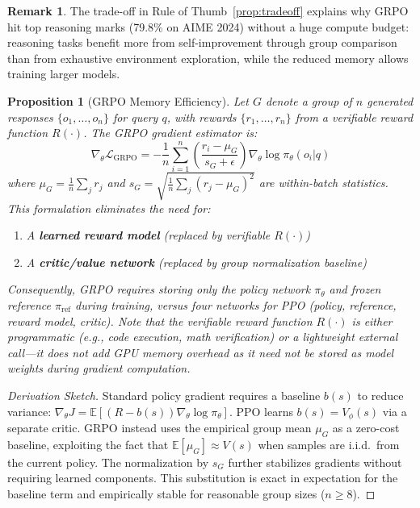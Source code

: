 \documentclass[12pt,a4paper]{report}
\newtheorem{proposition}[theorem]{Proposition}
\theoremstyle{definition}
\newtheorem{remark}[theorem]{Remark}
\begin{document}
\begin{remark}
The trade-off in Rule of Thumb~\ref{prop:tradeoff} explains why GRPO hit top reasoning marks (79.8\% on AIME 2024) without a huge compute budget: reasoning tasks benefit more from self-improvement through group comparison than from exhaustive environment exploration, while the reduced memory allows training larger models.
\end{remark}

\begin{proposition}[GRPO Memory Efficiency]
\label{prop:grpo_memory}
Let $G$ denote a group of $n$ generated responses $\{o_1, \ldots, o_n\}$ for query $q$, with rewards $\{r_1, \ldots, r_n\}$ from a verifiable reward function $R(\cdot)$. The GRPO gradient estimator is:
\begin{equation}
\nabla_\theta \mathcal{L}_{\text{GRPO}} = -\frac{1}{n} \sum_{i=1}^{n} \left( \frac{r_i - \mu_G}{s_G + \epsilon} \right) \nabla_\theta \log \pi_\theta(o_i | q)
\end{equation}
where $\mu_G = \frac{1}{n}\sum_j r_j$ and $s_G = \sqrt{\frac{1}{n}\sum_j (r_j - \mu_G)^2}$ are within-batch statistics. This formulation eliminates the need for:
\begin{enumerate}
    \item A \textbf{learned reward model} (replaced by verifiable $R(\cdot)$)
    \item A \textbf{critic/value network} (replaced by group normalization baseline)
\end{enumerate}
Consequently, GRPO requires storing only the policy network $\pi_\theta$ and frozen reference $\pi_{\text{ref}}$ during training, versus four networks for PPO (policy, reference, reward model, critic). Note that the verifiable reward function $R(\cdot)$ is either programmatic (e.g., code execution, math verification) or a lightweight external call---it does not add GPU memory overhead as it need not be stored as model weights during gradient computation.
\end{proposition}

\begin{proof}[Derivation Sketch]
Standard policy gradient requires a baseline $b(s)$ to reduce variance: $\nabla_\theta J = \mathbb{E}[(R - b(s)) \nabla_\theta \log \pi_\theta]$. PPO learns $b(s) = V_\phi(s)$ via a separate critic. GRPO instead uses the empirical group mean $\mu_G$ as a zero-cost baseline, exploiting the fact that $\mathbb{E}[\mu_G] \approx V(s)$ when samples are i.i.d.\ from the current policy. The normalization by $s_G$ further stabilizes gradients without requiring learned components. This substitution is exact in expectation for the baseline term and empirically stable for reasonable group sizes ($n \geq 8$).
\end{proof}
\end{document}
